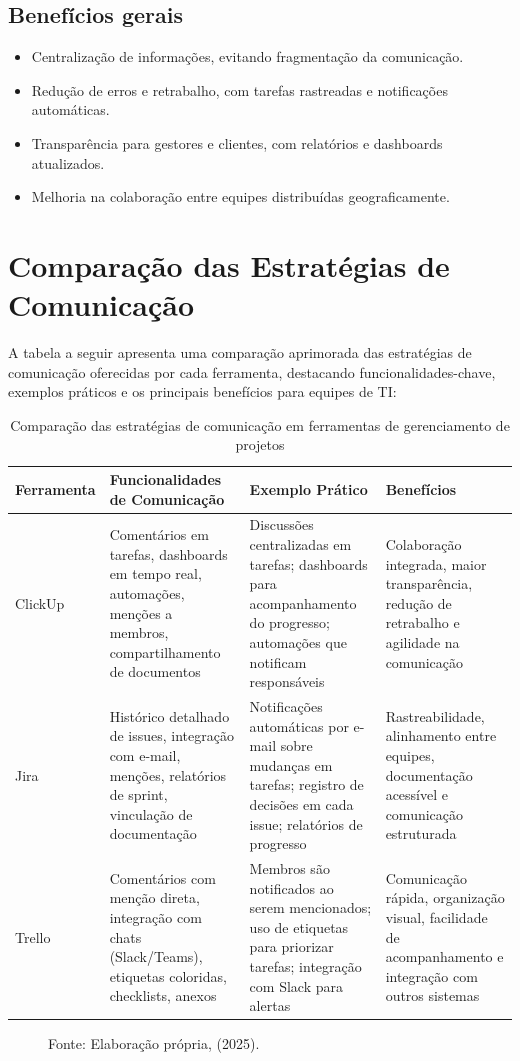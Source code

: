 \documentclass[12pt]{article}
\begin{document}
\subsection*{Benefícios gerais}

\begin{itemize}
    \item Centralização de informações, evitando fragmentação da comunicação.
    \item Redução de erros e retrabalho, com tarefas rastreadas e notificações automáticas.
    \item Transparência para gestores e clientes, com relatórios e dashboards atualizados.
    \item Melhoria na colaboração entre equipes distribuídas geograficamente.
\end{itemize}

\section{Comparação das Estratégias de Comunicação}
A tabela a seguir apresenta uma comparação aprimorada das estratégias de comunicação oferecidas por cada ferramenta, destacando funcionalidades-chave, exemplos práticos e os principais benefícios para equipes de TI:

\begin{table}[h!]
\centering
\caption{Comparação das estratégias de comunicação em ferramentas de gerenciamento de projetos}
\begin{tabular}{|p{2.1cm}|p{4.5cm}|p{4.2cm}|p{4cm}|}
\hline
\textbf{Ferramenta} & \textbf{Funcionalidades de Comunicação} & \textbf{Exemplo Prático} & \textbf{Benefícios} \\
\hline
ClickUp & Comentários em tarefas, dashboards em tempo real, automações, menções a membros, compartilhamento de documentos & Discussões centralizadas em tarefas; dashboards para acompanhamento do progresso; automações que notificam responsáveis & Colaboração integrada, maior transparência, redução de retrabalho e agilidade na comunicação \\
\hline
Jira & Histórico detalhado de issues, integração com e-mail, menções, relatórios de sprint, vinculação de documentação & Notificações automáticas por e-mail sobre mudanças em tarefas; registro de decisões em cada issue; relatórios de progresso & Rastreabilidade, alinhamento entre equipes, documentação acessível e comunicação estruturada \\
\hline
Trello & Comentários com menção direta, integração com chats (Slack/Teams), etiquetas coloridas, checklists, anexos & Membros são notificados ao serem mencionados; uso de etiquetas para priorizar tarefas; integração com Slack para alertas & Comunicação rápida, organização visual, facilidade de acompanhamento e integração com outros sistemas \\
\hline
\end{tabular}
\end{table}
\begin{figure}[H]
    \centering
    \captionsetup{labelformat=empty}   
    \caption{Tabela: Exemplo de dashboard do ClickUp utilizando o método Kanban.}
    \caption*{Fonte: Elaboração própria, (2025).}
\end{figure}
\end{document}
